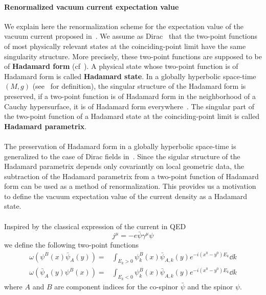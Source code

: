 \paragraph{Renormalized vacuum current expectation value}
We explain here the renormalization scheme for the expectation value of the vacuum current proposed in~\cite{Zahn2015}.
We assume as Dirac~\cite{Dirac1934} that the two-point functions of most physically relevant states at the coinciding-point limit have the same singularity structure.
More precisely, these two-point functions are supposed to be of \textbf{Hadamard form} (cf~\cite{Hollands2014}).
A physical state whose two-point function is of Hadamard form is called \textbf{Hadamard state}.
In a globally hyperbolic space-time $(M,g)$ (see~\cite{Wald2010} for definition), 
the singular structure of the Hadamard form is preserved, 
\ie if a two-point function is of Hadamard form in the neighborhood of a Cauchy hypersurface, it is of Hadamard form everywhere~\cite{Fulling1978}.
The singular part of the two-point function of a Hadamard state at the coinciding-point limit is called \textbf{Hadamard parametrix}.  \\\\
%
The preservation of Hadamard form in a globally hyperbolic space-time is generalized to the case of Dirac fields in~\cite{Sahlmann2000}.
Since the sigular structure of the Hadamard parametrix depends only covariantly on local geometric data, the subtraction of the Hadamard parametrix from a two-point function of Hadamard form can be used as a method of renormalization.
This provides us a motivation to define the vacuum expectation value of the current density as a Hadamard state.
\\\\
Inspired by the classical expression of the current in QED
\begin{equation*}
j^\mu = -e\bar{\psi}\gamma^\mu\psi
\end{equation*}
we define the following two-point functions
\begin{equation}\label{vacuum-hadamardstate}
\begin{split}
\omega(\psi^B(x)\bar{\psi}_A(y)) = & \int_{E_k >0} \psi_k^B(x)\bar{\psi}_{A,k}(y)e^{-i(x^0-y^0)E_k} \dd k \\
\omega(\bar{\psi}_A(y)\psi^B(x)) = & \int_{E_k <0} \psi_k^B(x)\bar{\psi}_{A,k}(y)e^{-i(x^0-y^0)E_k} \dd k 
\end{split}
\end{equation}
where $A$ and $B$ are component indices for the co-spinor $\bar{\psi}$ and the spinor $\psi$.
